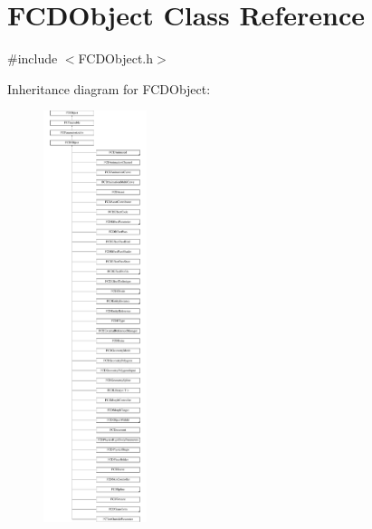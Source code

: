 \hypertarget{classFCDObject}{
\section{FCDObject Class Reference}
\label{classFCDObject}
}


{\ttfamily \#include $<$FCDObject.h$>$}

Inheritance diagram for FCDObject:\begin{figure}[H]
\begin{center}
\leavevmode
\includegraphics[height=12.000000cm]{classFCDObject}
\end{center}
\end{figure}
